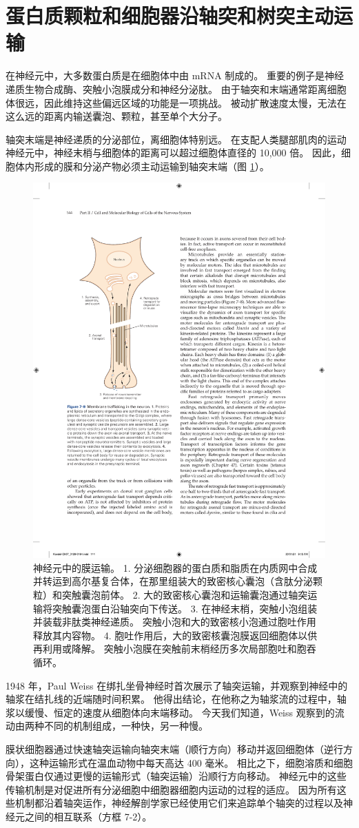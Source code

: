 \section{蛋白质颗粒和细胞器沿轴突和树突主动运输}
在神经元中，大多数蛋白质是在细胞体中由 mRNA 制成的。 
重要的例子是神经递质生物合成酶、突触小泡膜成分和神经分泌肽。 
由于轴突和末端通常距离细胞体很远，因此维持这些偏远区域的功能是一项挑战。 
被动扩散速度太慢，无法在这么远的距离内输送囊泡、颗粒，甚至单个大分子。


轴突末端是神经递质的分泌部位，离细胞体特别远。 
在支配人类腿部肌肉的运动神经元中，神经末梢与细胞体的距离可以超过细胞体直径的 10,000 倍。 
因此，细胞体内形成的膜和分泌产物必须主动运输到轴突末端（图 \ref{fig:7_9}）。

\begin{figure}[htbp]
	\centering
	\includegraphics[width=0.5\linewidth]{chap07/fig_7_9}
	\caption{神经元中的膜运输。 1. 分泌细胞器的蛋白质和脂质在内质网中合成并转运到高尔基复合体，在那里组装大的致密核心囊泡（含肽分泌颗粒）和突触囊泡前体。 2. 大的致密核心囊泡和运输囊泡通过轴突运输将突触囊泡蛋白沿轴突向下传送。 3. 在神经末梢，突触小泡组装并装载非肽类神经递质。 突触小泡和大的致密核小泡通过胞吐作用释放其内容物。 4. 胞吐作用后，大的致密核囊泡膜返回细胞体以供再利用或降解。 突触小泡膜在突触前末梢经历多次局部胞吐和胞吞循环。}
	\label{fig:7_9}
\end{figure}


1948 年，Paul Weiss 在绑扎坐骨神经时首次展示了轴突运输，并观察到神经中的轴浆在结扎线的近端随时间积累。 
他得出结论，在他称之为轴浆流的过程中，轴浆以缓慢、恒定的速度从细胞体向末端移动。 
今天我们知道，Weiss 观察到的流动由两种不同的机制组成，一种快，另一种慢。


膜状细胞器通过快速轴突运输向轴突末端（顺行方向）移动并返回细胞体（逆行方向），这种运输形式在温血动物中每天高达 400 毫米。 
相比之下，细胞溶质和细胞骨架蛋白仅通过更慢的运输形式（轴突运输）沿顺行方向移动。 
神经元中的这些传输机制是对促进所有分泌细胞中细胞器细胞内运动的过程的适应。 
因为所有这些机制都沿着轴突运作，神经解剖学家已经使用它们来追踪单个轴突的过程以及神经元之间的相互联系（方框 7-2）。


